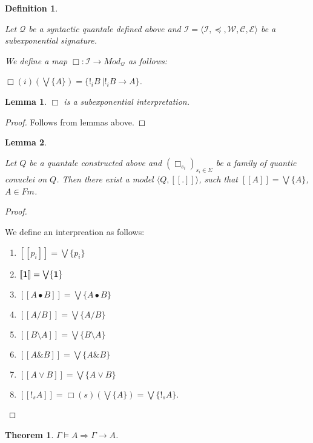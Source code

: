 \documentclass[a4paper]{article}
\theoremstyle{defin}
\newtheorem{defin}{Definition}
\theoremstyle{theorem}
\newtheorem{theorem}{Theorem}
\theoremstyle{prop}
\theoremstyle{lemma}
\newtheorem{lemma}{Lemma}
\theoremstyle{ex}
\theoremstyle{col}
\begin{document}
\begin{defin}
$ $

Let $\mathcal{Q}$ be a syntactic quantale defined above and $\mathcal{I} = \langle \mathcal{I}, \preceq,
\mathcal{W}, \mathcal{C}, \mathcal{E} \rangle$ be a subexponential signature.

We define a map $\Box : \mathcal{I} \to Mod_{\mathcal{Q}}$ as follows:

$\Box(i)(\bigvee \{ A \} ) = \{ !_i B \: | !_i B \rightarrow A \}$.
\end{defin}

\begin{lemma} $\Box$ is a subexponential interpretation.
\end{lemma}

\begin{proof}
  Follows from lemmas above.
\end{proof}

\begin{lemma}
$ $

  Let $Q$ be a quantale constructed above and $(\Box_{s_i})_{s_i \in \Sigma}$ be a family of quantic conuclei on $Q$.
  Then there exist a model $\langle Q, [\![.]\!]\rangle$, such that $[\![A]\!] = \bigvee \{ A \}$, $A \in Fm$.
\end{lemma}

\begin{proof}
$ $

  We define an interpreation as follows:

\begin{enumerate}
  \item $[\![p_i]\!] = \bigvee \{ p_i \}$
  \item $[\![{\bf 1}]\!] = \bigvee \{ {\bf 1} \}$
  \item $[\![A \bullet B]\!] = \bigvee \{ A \bullet B \}$
  \item $[\![A / B]\!] = \bigvee \{ A / B \}$
  \item $[\![B \setminus A]\!] = \bigvee \{ B \setminus A \}$
  \item $[\![A \& B ]\!] = \bigvee \{ A \& B \}$
  \item $[\![A \lor B]\!] = \bigvee \{ A \lor B\}$
  \item $[\![!_s A]\!] = \Box(s) (\bigvee \{ A \}) = \bigvee \{ !_s A \}$.
\end{enumerate}
\end{proof}

\begin{theorem}
  $\Gamma \models A \Rightarrow \Gamma \rightarrow A$.
\end{theorem}
\end{document}
